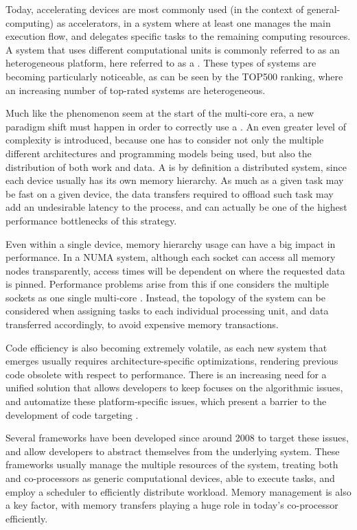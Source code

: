 \documentclass[main.tex]{subfiles}
\begin{document}
Today, accelerating devices are most commonly used (in the context of general-computing) as accelerators, in a system where at least one \cpu manages the main execution flow, and delegates specific tasks to the remaining computing resources. A system that uses different computational units is commonly referred to as an heterogeneous platform, here referred to as a \hetplat. These types of systems are becoming particularly noticeable, as can be seen by the TOP500 ranking, where an increasing number of top-rated systems are heterogeneous.

Much like the phenomenon seem at the start of the multi-core era, a new paradigm shift must happen in order to correctly use a \hetplat. An even greater level of complexity is introduced, because one has to consider not only the multiple different architectures and programming models being used, but also the distribution of both work and data. A \hetplat is by definition a distributed system, since each device usually has its own memory hierarchy. As much as a given task may be fast on a given device, the data transfers required to offload such task may add an undesirable latency to the process, and can actually be one of the highest performance bottlenecks of this strategy.

Even within a single device, memory hierarchy usage can have a big impact in performance. In a \acs{NUMA} system, although each socket can access all memory nodes transparently, access times will be dependent on where the requested data is pinned. Performance problems arise from this if one considers the multiple sockets as one single multi-core \cpu. Instead, the topology of the system can be considered when assigning tasks to each individual processing unit, and data transferred accordingly, to avoid expensive memory transactions.

Code efficiency is also becoming extremely volatile, as each new system that emerges usually requires architecture-specific optimizations, rendering previous code obsolete with respect to performance. There is an increasing need for a unified solution that allows developers to keep focuses on the algorithmic issues, and automatize these platform-specific issues, which present a barrier to the development of code targeting \hetplats.

Several frameworks have been developed since around 2008 to target these issues, and allow developers to abstract themselves from the underlying system. These frameworks usually manage the multiple resources of the system, treating both \cpus and co-processors as generic computational devices, able to execute tasks, and employ a scheduler to efficiently distribute workload. Memory management is also a key factor, with memory transfers playing a huge role in today's co-processor efficiently.
\end{document}
